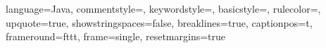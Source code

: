 {	language=Java,
    commentstyle=\color{green}\ttfamily,
    keywordstyle=\color{RoyalBlue},
    basicstyle=\footnotesize,
    rulecolor=\color{black},
    upquote=true,
    showstringspaces=false,
    breaklines=true,
    captionpos=t,                    
    frameround=fttt,
    frame=single,
    resetmargins=true
}

\lstset{language=C++, resetmargins=true}
\lstset{language=Python, resetmargins=true}
\lstset{language=Java, resetmargins=true}

\renewcommand{\lstlistlistingname}{Quellcodeverzeichnis}
\renewcommand{\lstlistingname}{Skript}



\usepackage{units}





\makeatletter
\g@addto@macro\normalsize{%
\setlength{\abovedisplayskip}{5pt} 
\setlength{\belowdisplayskip}{5pt} 
\setlength{\abovedisplayshortskip}{5pt} 
\setlength{\belowdisplayshortskip}{5pt}} 

\makeatother






